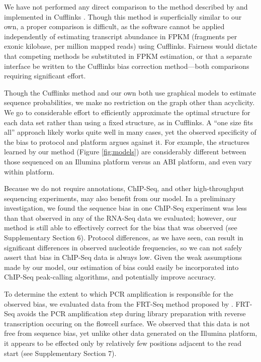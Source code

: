 \documentclass{bioinfo}
\begin{document}
We have not performed any direct comparison to the method described by
\citet{Roberts2011} and implemented in Cufflinks \citep{Trapnell2010}. Though
this method is superficially similar to our own, a proper comparison is
difficult, as the software cannot be applied independently of estimating
transcript abundance in FPKM (fragments per exonic kilobase, per million mapped
reads) using Cufflinks. Fairness would dictate that competing methods be
substituted in FPKM estimation, or that a separate interface be written to the
Cufflinks bias correction method---both comparisons requiring significant effort.

Though the Cufflinks method and our own both use graphical models to estimate
sequence probabilities, we make no restriction on the graph other than
acyclicity. We go to considerable effort to efficiently approximate the optimal
structure for each data set rather than using a fixed structure, as in
Cufflinks. A ``one size fits all'' approach likely works quite well in many
cases, yet the observed specificity of the bias to protocol and platform argues
against it. For example, the structures learned by our method (Figure
\ref{fig:models}) are considerably different between those sequenced on an
Illumina platform versus an ABI platform, and even vary within platform.

Because we do not require annotations, ChIP-Seq, and other high-throughput
sequencing experiments, may also benefit from our model. In a preliminary
investigation, we found the sequence bias in one ChIP-Seq experiment
\cite{Cao2010} was less than that observed in any of the RNA-Seq data we
evaluated; however, our method is still able to effectively correct for the bias
that was observed (see Supplementary Section 6).  Protocol differences, as we
have seen, can result in significant differences in observed nucleotide
frequencies, so we can not safely assert that bias in ChIP-Seq data is always
low.  Given the weak assumptions made by our model, our estimation of bias could
easily be incorporated into ChIP-Seq peak-calling algorithms, and potentially
improve accuracy.

To determine the extent to which PCR amplification is responsible for the
observed bias, we evaluated data from the FRT-Seq method proposed by
\citet{Mamanova2010}.  FRT-Seq avoids the PCR amplification step during library
preparation with reverse transcription occuring on the flowcell surface. We
observed that this data is not free from sequence bias, yet unlike other data
generated on the Illumina platform, it appears to be effected only by relatively
few positions adjacent to the read start (see Supplementary Section 7).
\end{document}
